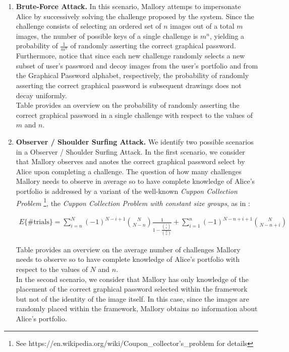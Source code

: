 \documentclass[11pt,a4paper]{article}
\theoremstyle{defn, nobreak=true}
\begin{document}
\begin{enumerate}

	\item \textbf{Brute-Force Attack.} In this scenario, Mallory attemps to impersonate Alice by successively solving the challenge proposed by the system. Since the challenge consists of selecting an ordered set of $n$ images out of a total $m$ images, the number of possible keys of a single challenge is $m^n$, yielding a probability of $\frac{1}{m^n}$ of randomly asserting the correct graphical password. Furthermore, notice that since each new challenge randomly selects a new subset of user's password and decoy images from the user's portfolio and from the Graphical Password alphabet, respectively, the probability of randomly asserting the correct graphical password is subsequent drawings does not decay uniformly. \\

	Table \cite{tab:observerattk} provides an overview on the probability of randomly asserting the correct graphical password in a single challenge with respect to the values of $m$ and $n$.

	\item \textbf{Observer / Shoulder Surfing Attack.} We identify two possible scenarios in a Observer / Shoulder Surfing Attack. In the first scenario, we consider that Mallory observes and anotes the correct graphical password select by Alice upon completing a challenge. The question of how many challenges Mallory needs to observe in average so to have complete knowledge of Alice's portfolio is addressed by a variant of the well-known \textit{Cuppon Collection Problem} \footnote{See https://en.wikipedia.org/wiki/Coupon\_collector's\_problem for details}, the \textit{Cuppon Collection Problem with constant size groups}, as in \cite{Ferrante2014}: 

	\begin{align}
		E\{\mathrm{\# trials} \} = \sum\limits_{i=n}^{N} (-1)^{N-i+1} \binom N{N-n} \frac{1}{1-\frac{\binom in}{\binom Nn}} + \sum\limits_{i=1}^{n} (-1)^{N-n+i+1} \binom N{N-n+i}
	\end{align}

	Table \cite{tab:observerattk} provides an overview on the average number of challenges Mallory needs to observe so to have complete knowledge of Alice's portfolio with respect to the values of $N$ and $n$. \\

	In the second scenario, we consider that Mallory has only knowledge of the placement of the correct graphical password selected within the framework but not of the identity of the image itself. In this case, since the images are randomly placed within the framework, Mallory obtains no information about Alice's portfolio. 


\end{enumerate}
\end{document}
